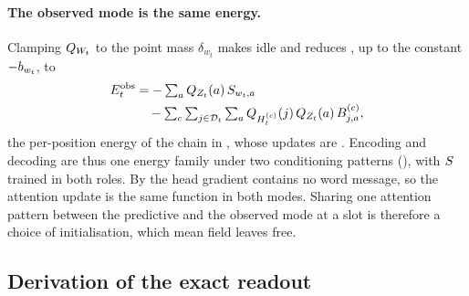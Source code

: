 \paragraph{The observed mode is the same energy.}
Clamping $Q_{W_{t}}$ to the point mass $\delta_{w_t}$ makes  idle and
reduces , up to the constant $-b_{w_t}$, to
%
\begin{equation}
\label{eq:obs-energy}
\begin{aligned}
  E_t^{\text{obs}} &= -\textstyle\sum_a Q_{Z_{t}}(a)\,S_{w_t,a}\\
    &\quad -\textstyle\sum_c \sum_{j\in\mathcal{D}_{t}} \sum_a
      Q_{H_{t}^{(c)}}(j)\,Q_{Z_{t}}(a)\,B^{(c)}_{j,a},
\end{aligned}
\end{equation}
%
the per-position energy of the chain in , whose updates are
. Encoding and decoding are thus one energy family under two
conditioning patterns (), with $S$ trained in both roles. By
 the head gradient contains no word message, so the attention update is the same
function in both modes. Sharing one attention pattern between the predictive and the observed
mode at a slot is therefore a choice of initialisation, which mean field leaves free.

\subsection{Derivation of the exact readout}
\label{app:exact-derivation}

